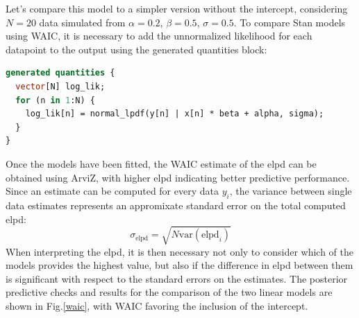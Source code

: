 Let's compare this model to a simpler version without the intercept, considering $N=20$ data simulated from
$\alpha=0.2$, $\beta=0.5$, $\sigma=0.5$. To compare Stan models using WAIC, it is necessary to add the unnormalized
likelihood for each datapoint to the output using the generated quantities block:
\begin{lstlisting}[language=Stan]
generated quantities {
  vector[N] log_lik;
  for (n in 1:N) {
    log_lik[n] = normal_lpdf(y[n] | x[n] * beta + alpha, sigma);
  }
}
\end{lstlisting}
Once the models have been fitted, the WAIC estimate of the elpd can be obtained using ArviZ, with higher elpd indicating
better predictive performance. Since an estimate can be computed for every data $y_i$, the variance between single data
estimates represents an appromixate standard error on the total computed elpd:
\begin{equation}
  \sigma_{\text{elpd}} = \sqrt{N \text{var}(\text{elpd}_i)} 
\end{equation}
When interpreting the elpd, it is then necessary not only to consider which of the models provides the highest 
value, but also if
the difference in elpd between them is significant with respect to the standard errors on the estimates. The posterior predictive checks and results for the comparison of the two linear models are shown in Fig.\ref{waic}, with WAIC favoring the inclusion of the intercept.
